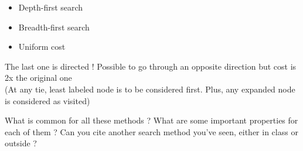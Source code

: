 \documentclass[11pt,a4paper,BCOR12mm, headexclude, footexclude, twoside, openright]{scrartcl}
\newcommand*{\TakeFourierOrnament}[1]{{%
\fontencoding{U}\fontfamily{futs}\selectfont\char#1}}
\newcommand*{\danger}{\TakeFourierOrnament{66}}
\numberwithin{equation}{section} %
\numberwithin{figure}{section} %
\numberwithin{table}{section} %
\begin{document}
\begin{itemize}
	\item Depth-first search
    \item Breadth-first search
    \item Uniform cost
\end{itemize}

\danger The last one is directed ! Possible to go through an opposite direction but cost is 2x the original one\\
(At any tie, least labeled node is to be considered first. Plus, any expanded node is considered as visited)

What is common for all these methods ? What are some important properties for each of them ? Can you cite another search method you've seen, either in class or outside ?
\end{document}
